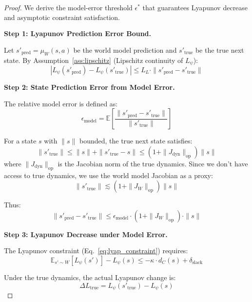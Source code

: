 \documentclass{article}
\theoremstyle{plain}
\theoremstyle{definition}
\theoremstyle{remark}
\begin{document}
\begin{proof}
We derive the model-error threshold $\epsilon^*$ that guarantees Lyapunov decrease and asymptotic constraint satisfaction.

\textbf{Step 1: Lyapunov Prediction Error Bound.}

Let $s'_{\text{pred}} = \mu_W(s, a)$ be the world model prediction and $s'_{\text{true}}$ be the true next state. By Assumption~\ref{ass:lipschitz} (Lipschitz continuity of $L_\psi$):
\begin{equation}
|L_\psi(s'_{\text{pred}}) - L_\psi(s'_{\text{true}})| \leq L_L \cdot \|s'_{\text{pred}} - s'_{\text{true}}\|
\label{eq:lyap_error_bound}
\end{equation}

\textbf{Step 2: State Prediction Error from Model Error.}

The relative model error is defined as:
\begin{equation}
\epsilon_{\text{model}} = \mathbb{E}\left[\frac{\|s'_{\text{pred}} - s'_{\text{true}}\|}{\|s'_{\text{true}}\|}\right]
\end{equation}

For a state $s$ with $\|s\|$ bounded, the true next state satisfies:
\begin{equation}
\|s'_{\text{true}}\| \leq \|s\| + \|s'_{\text{true}} - s\| \leq (1 + \|J_{\text{dyn}}\|_{\text{op}}) \|s\|
\end{equation}
where $\|J_{\text{dyn}}\|_{\text{op}}$ is the Jacobian norm of the true dynamics. Since we don't have access to true dynamics, we use the world model Jacobian as a proxy:
\begin{equation}
\|s'_{\text{true}}\| \lesssim (1 + \|J_W\|_{\text{op}}) \|s\|
\end{equation}

Thus:
\begin{equation}
\|s'_{\text{pred}} - s'_{\text{true}}\| \leq \epsilon_{\text{model}} \cdot (1 + \|J_W\|_{\text{op}}) \cdot \|s\|
\label{eq:state_error_bound}
\end{equation}

\textbf{Step 3: Lyapunov Decrease under Model Error.}

The Lyapunov constraint (Eq.~\ref{eq:lyap_constraint}) requires:
\begin{equation}
\mathbb{E}_{s' \sim W}[L_\psi(s')] - L_\psi(s) \leq -\kappa \cdot d_C(s) + \delta_{\text{slack}}
\end{equation}

Under the true dynamics, the actual Lyapunov change is:
\begin{equation}
\Delta L_{\text{true}} = L_\psi(s'_{\text{true}}) - L_\psi(s)
\end{equation}


\end{proof}
\end{document}
